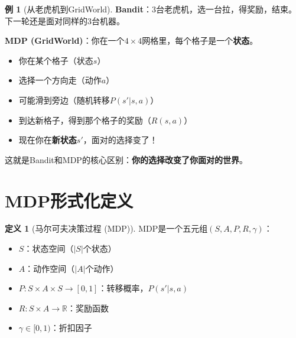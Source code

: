 \documentclass[11pt,a4paper]{article}
\theoremstyle{definition}
\newtheorem{definition}{定义}[section]
\newtheorem{example}{例}[section]
\begin{document}
\begin{example}[从老虎机到GridWorld]
\textbf{Bandit}：3台老虎机，选一台拉，得奖励，结束。下一轮还是面对同样的3台机器。

\textbf{MDP (GridWorld)}：你在一个$4\times4$网格里，每个格子是一个\textbf{状态}。

\begin{center}
\end{center}

\begin{itemize}
    \item 你在某个格子（状态$s$）
    \item 选择一个方向走（动作$a$）
    \item 可能滑到旁边（随机转移$P(s'|s,a)$）
    \item 到达新格子，得到那个格子的奖励（$R(s,a)$）
    \item 现在你在\textbf{新状态}$s'$，面对的选择变了！
\end{itemize}

这就是Bandit和MDP的核心区别：\textbf{你的选择改变了你面对的世界}。
\end{example}

\section{MDP形式化定义}

\begin{definition}[马尔可夫决策过程 (MDP)]
MDP是一个五元组$(S, A, P, R, \gamma)$：
\begin{itemize}
    \item $S$：状态空间（$|S|$个状态）
    \item $A$：动作空间（$|A|$个动作）
    \item $P: S \times A \times S \to [0,1]$：转移概率，$P(s'|s,a)$
    \item $R: S \times A \to \mathbb{R}$：奖励函数
    \item $\gamma \in [0,1)$：折扣因子
\end{itemize}
\end{definition}
\end{document}
